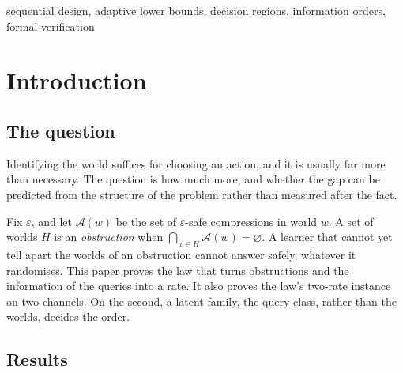 \begin{IEEEkeywords}
sequential design, adaptive lower bounds, decision regions, information orders, formal
verification
\end{IEEEkeywords}

\section{Introduction}
\label{sec:intro}

\subsection{The question}

Identifying the world suffices for choosing an action, and it is usually far more than
necessary. The question is how much more, and whether the gap can be predicted from the
structure of the problem rather than measured after the fact.

Fix $\varepsilon$, and let $\mathcal A(w)$ be the set of $\varepsilon$-safe compressions in
world $w$. A set of worlds $H$ is an \emph{obstruction} when
$\bigcap_{w\in H}\mathcal A(w)=\varnothing$. A learner that cannot yet tell apart the worlds of
an obstruction cannot answer safely, whatever it randomises. This paper proves the law that
turns obstructions and the information of the queries into a rate. It also proves the law's
two-rate instance on two channels. On the second, a latent family, the query class, rather than
the worlds, decides the order.

\subsection{Results}

